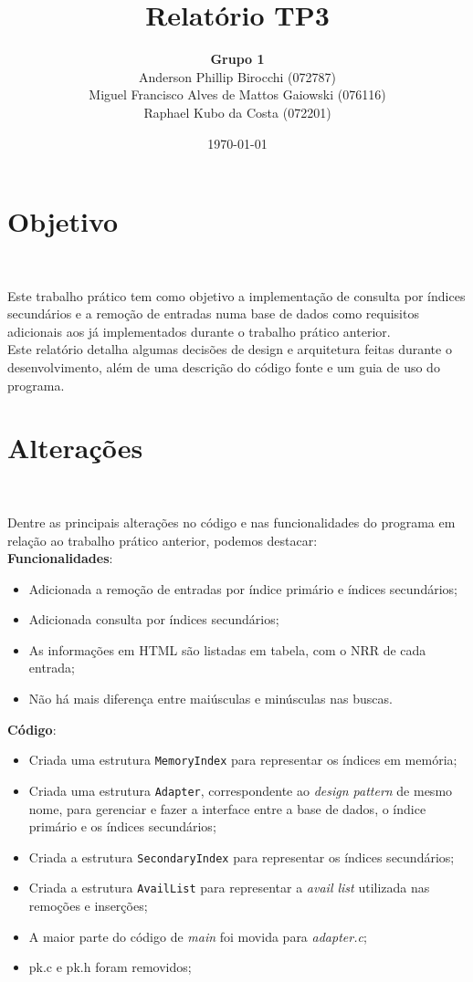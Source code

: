 \documentclass{article}
\title{\textbf{Relatório TP3}}
\author{\textbf{Grupo 1} \\
  Anderson Phillip Birocchi (072787) \\
  Miguel Francisco Alves de Mattos Gaiowski (076116) \\
  Raphael Kubo da Costa (072201)}
\date{\today}
\begin{document}
\maketitle

\section{Objetivo}\

Este trabalho prático tem como objetivo a implementação de consulta por índices secundários e a remoção de entradas numa base de dados como requisitos adicionais aos já implementados durante o trabalho prático anterior.\\

Este relatório detalha algumas decisões de design e arquitetura feitas durante o desenvolvimento, além de uma descrição do código fonte e um guia de uso do programa.

\section{Alterações}\

Dentre as principais alterações no código e nas funcionalidades do programa em relação ao trabalho prático anterior, podemos destacar:\\

\textbf{Funcionalidades}:
\begin{itemize}
 \item Adicionada a remoção de entradas por índice primário e índices secundários;
\item Adicionada consulta por índices secundários;
\item As informações em HTML são listadas em tabela, com o NRR de cada entrada;
\item Não há mais diferença entre maiúsculas e minúsculas nas buscas.
\end{itemize}

\textbf{Código}:
\begin{itemize}
 \item Criada uma estrutura \texttt{MemoryIndex} para representar os índices em memória;
\item Criada uma estrutura \texttt{Adapter}, correspondente ao \textit{design pattern} de mesmo nome, para gerenciar e fazer a interface entre a base de dados, o índice primário e os índices secundários;
\item Criada a estrutura \texttt{SecondaryIndex} para representar os índices secundários;
\item Criada a estrutura \texttt{AvailList} para representar a \textit{avail list} utilizada nas remoções e inserções;
\item A maior parte do código de \textit{main} foi movida para \textit{adapter.c};
\item pk.c e pk.h foram removidos;
\end{itemize}
\end{document}
